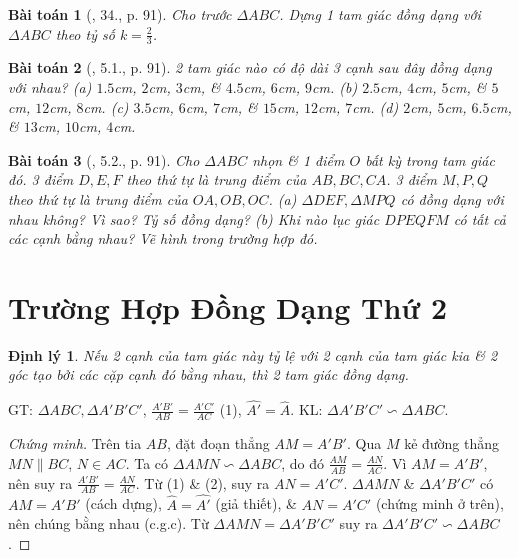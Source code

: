 \documentclass{article}
\newtheorem{baitoan}{Bài toán}
\newtheorem{dinhly}{Định lý}
\begin{document}
\begin{baitoan}[\cite{SBT_Toan_8_tap_2}, 34., p. 91]
	Cho trước $\Delta ABC$. Dựng 1 tam giác đồng dạng với $\Delta ABC$ theo tỷ số $k = \frac{2}{3}$.
\end{baitoan}

\begin{baitoan}[\cite{SBT_Toan_8_tap_2}, 5.1., p. 91]
	2 tam giác nào có độ dài 3 cạnh sau đây đồng dạng với nhau? (a) $1.5$\emph{cm}, $2$\emph{cm}, $3$\emph{cm}, \& $4.5$\emph{cm}, $6$\emph{cm}, $9$\emph{cm}. (b) $2.5$\emph{cm}, $4$\emph{cm}, $5$\emph{cm}, \& $5$\emph{cm}, $12$\emph{cm}, $8$\emph{cm}. (c) $3.5$\emph{cm}, $6$\emph{cm}, $7$\emph{cm}, \& $15$\emph{cm}, $12$\emph{cm}, $7$\emph{cm}. (d) $2$\emph{cm}, $5$\emph{cm}, $6.5$\emph{cm}, \& $13$\emph{cm}, $10$\emph{cm}, $4$\emph{cm}.
\end{baitoan}

\begin{baitoan}[\cite{SBT_Toan_8_tap_2}, 5.2., p. 91]
	Cho $\Delta ABC$ nhọn \& 1 điểm $O$ bất kỳ trong tam giác đó. 3 điểm $D,E,F$ theo thứ tự là trung điểm của $AB,BC,CA$. 3 điểm $M,P,Q$ theo thứ tự là trung điểm của $OA,OB,OC$. (a) $\Delta DEF,\Delta MPQ$ có đồng dạng với nhau không? Vì sao? Tỷ số đồng dạng? (b) Khi nào lục giác $DPEQFM$ có tất cả các cạnh bằng nhau? Vẽ hình trong trường hợp đó.
\end{baitoan}


\section{Trường Hợp Đồng Dạng Thứ 2}

\begin{dinhly}
	Nếu 2 cạnh của tam giác này tỷ lệ với 2 cạnh của tam giác kia \& 2 góc tạo bởi các cặp cạnh đó bằng nhau, thì 2 tam giác đồng dạng.
\end{dinhly}
GT: $\Delta ABC,\Delta A'B'C'$, $\frac{A'B'}{AB} = \frac{A'C'}{AC}$ (1), $\widehat{A'} = \widehat{A}$. KL: $\Delta A'B'C'\backsim\Delta ABC$.

\begin{proof}[Chứng minh]
	Trên tia $AB$, đặt đoạn thẳng $AM = A'B'$. Qua $M$ kẻ đường thẳng $MN\parallel BC$, $N\in AC$. Ta có $\Delta AMN\backsim\Delta ABC$, do đó $\frac{AM}{AB} = \frac{AN}{AC}$. Vì $AM = A'B'$, nên suy ra $\frac{A'B'}{AB} = \frac{AN}{AC}$. Từ (1) \& (2), suy ra $AN = A'C'$. $\Delta AMN$ \& $\Delta A'B'C'$ có $AM = A'B'$ (cách dựng), $\widehat{A} = \widehat{A'}$ (giả thiết), \& $AN = A'C'$ (chứng minh ở trên), nên chúng bằng nhau (c.g.c). Từ $\Delta AMN = \Delta A'B'C'$ suy ra $\Delta A'B'C'\backsim\Delta ABC$.
\end{proof}
\end{document}
